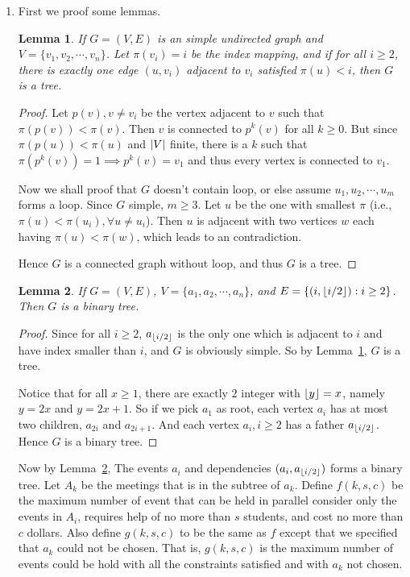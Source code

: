 \documentclass[12pt, a4paper]{article}
\DeclarePairedDelimiter{\abs}{\lvert}{\rvert}
\DeclarePairedDelimiter{\floor}{\lfloor}{\rfloor}
\newtheorem{lemma}{Lemma}
\begin{document}
\begin{enumerate}
  \item First we proof some lemmas.
    \begin{lemma} \label{lm:tree}
      If $G = (V, E)$ is an simple undirected graph and $V = \{v_1, v_2, \cdots, v_n\}$. Let $\pi(v_i) = i$ be
      the index mapping, and if for all $i \geq 2$, there is exactly one edge $(u, v_i)$ adjacent to $v_i$
      satisfied $\pi(u) < i$, then $G$ is a tree.
    \end{lemma}
    \begin{proof}
      Let $p(v), v \neq v_i$ be the vertex adjacent to $v$ such that $\pi(p(v)) < \pi(v)$. Then $v$ is connected
      to $p^k(v)$ for all $k \geq 0$. But since $\pi(p(u)) < \pi(u)$ and $\abs{V}$ finite, there is a $k$ such that 
      $\pi(p^k(v)) = 1 \implies p^k(v) = v_1$ and thus every vertex is connected to $v_1$.

      Now we shall proof that $G$ doesn't contain loop, or else assume $u_1, u_2, \cdots, u_m$ forms a loop.
      Since $G$ simple, $m \geq 3$. Let $u$ be the one with smallest $\pi$ (i.e., $\pi(u) < \pi(u_i), \forall u \neq u_i$).
      Then $u$ is adjacent with two vertices $w$ each having $\pi(u) < \pi(w)$, which leads to an contradiction.

      Hence $G$ is a connected graph without loop, and thus $G$ is a tree.
    \end{proof}

    \begin{lemma} \label{lm:bt}
      If $G = (V, E)$, $V = \{a_1, a_2, \cdots, a_n\}$, and $E = \{(i, \floor{i/2}): i \geq 2\}$. 
      Then $G$ is a binary tree.
    \end{lemma}
    \begin{proof}
      Since for all $i \geq 2$, $a_{\floor{i/2}}$ is the only one which is adjacent to $i$ and 
      have index smaller than $i$, and $G$ is obviously simple. So by Lemma~\ref{lm:tree}, $G$ is a tree.

      Notice that for all $x \geq 1$, there are exactly $2$ integer with $\floor{y} = x$, namely
      $y = 2x$ and $y = 2x+1$. So if we pick $a_1$ as root, each vertex $a_i$ has at most two children, 
      $a_{2i}$ and $a_{2i+1}$. And each vertex $a_i, i \geq 2$ has a father $a_{\floor{i/2}}$.
      Hence $G$ is a binary tree.
    \end{proof}

    Now by Lemma~\ref{lm:bt}, The events $a_i$ and dependencies $(a_i, a_{\floor{i/2}})$ forms a binary tree.
    Let $A_k$ be the meetings that is in the subtree of $a_k$. Define $f(k, s, c)$ be the maximum number of 
    event that can be held in parallel consider only the events in $A_i$,
    requires help of no more than $s$ students, and cost no more than $c$ dollars. Also define $g(k, s, c)$
    to be the same as $f$ except that we specified that $a_k$ could not be chosen. That is, $g(k, s, c)$ is the 
    maximum number of events could be hold with all the constraints satisfied and with $a_k$ not chosen.
    

\end{enumerate}
\end{document}
